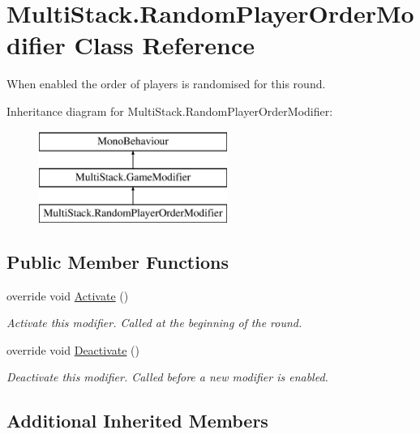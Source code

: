 \hypertarget{class_multi_stack_1_1_random_player_order_modifier}{}\section{Multi\+Stack.\+Random\+Player\+Order\+Modifier Class Reference}
\label{class_multi_stack_1_1_random_player_order_modifier}


When enabled the order of players is randomised for this round.  


Inheritance diagram for Multi\+Stack.\+Random\+Player\+Order\+Modifier\+:\begin{figure}[H]
\begin{center}
\leavevmode
\includegraphics[height=3.000000cm]{class_multi_stack_1_1_random_player_order_modifier}
\end{center}
\end{figure}
\subsection*{Public Member Functions}
\begin{DoxyCompactItemize}
\item 
override void \hyperlink{class_multi_stack_1_1_random_player_order_modifier_a6f2965f6ee8933b1631974cefba9bd00}{Activate} ()
\begin{DoxyCompactList}\small\item\em Activate this modifier. Called at the beginning of the round. \end{DoxyCompactList}\item 
override void \hyperlink{class_multi_stack_1_1_random_player_order_modifier_a75341a38b55dde95e4037d5ce829ed72}{Deactivate} ()
\begin{DoxyCompactList}\small\item\em Deactivate this modifier. Called before a new modifier is enabled. \end{DoxyCompactList}\end{DoxyCompactItemize}
\subsection*{Additional Inherited Members}


